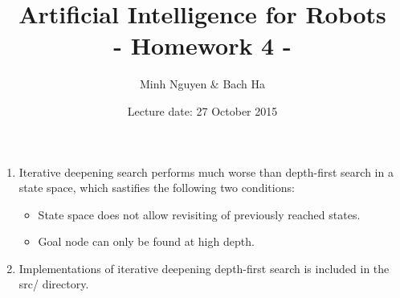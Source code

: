 \documentclass[a4paper, 12pt]{article}
\title{Artificial Intelligence for Robots \\
				- Homework 4 -}
\author{Minh Nguyen \& Bach Ha}
\date{Lecture date: 27 October 2015}
\begin{document}
\maketitle

\begin{enumerate}

	\item Iterative deepening search performs much worse than depth-first search in a state
	space, which sastifies the following two conditions:
	\begin{itemize}
		\item State space does not allow revisiting of previously reached states.
		\item Goal node can only be found at high depth.
	\end{itemize}

	\item Implementations of iterative deepening depth-first search is included in the
    src/ directory.


\end{enumerate}
\end{document}
